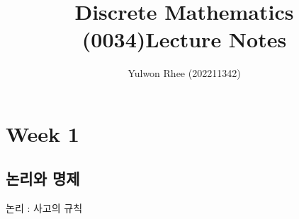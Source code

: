 



\title{Discrete Mathematics (0034)\newline\space Lecture Notes}
\author{Yulwon Rhee (202211342)}

\maketitle
\section{Week 1}
\subsection{논리와 명제}
논리 : 사고의 규칙



